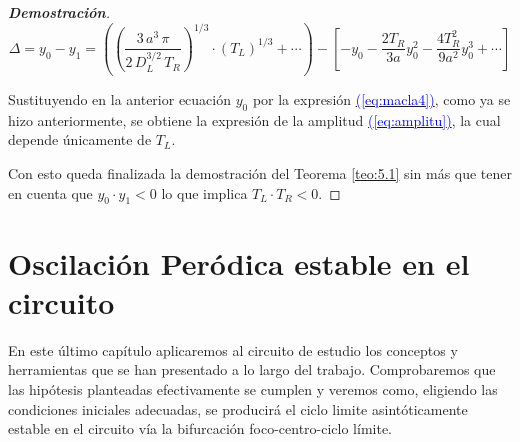 \documentclass[12pt,a4paper]{report} %
\newcommand{\eref}[1]{\hyperref[#1]{\textcolor{blue}{(\ref*{#1})}}}
\newcommand{\eref}[1]{\hyperref[#1]{\textcolor{blue}{\textit{(\ref*{#1})}}}}
\begin{document}
\begin{proof}[\textbf{Demostración}]
	\begin{equation}
		\varDelta=y_0-y_1=\left( \left( \frac{3\, a^3 \, \pi}{2\, D_L^{3/2}\, T_R} \right)^{1/3}\cdot \left(T_L\right)^{1/3}+\cdots \right) - \left[ -y_0-\frac{2T_R}{3a}y_0^2-\frac{4T_R^2}{9a^2}y_0^3+\cdots \right]
	\end{equation}\smallskip
	
	\noindent Sustituyendo en la anterior ecuación $y_0$ por la expresión \eref{eq:macla4}, como ya se hizo anteriormente, se obtiene la expresión de la amplitud \eref{eq:amplitu}, la cual depende únicamente de $T_L$.
	

\vspace{0.5cm} Con esto queda finalizada la demostración del Teorema \ref{teo:5.1} sin más que tener en cuenta que $y_0\cdot y_1<0$ lo que implica $T_L\cdot T_R<0$.

\end{proof}
	
	\newpage
	
	\chapter{Oscilación Peródica estable en el circuito}
	\label{cap.55}
	
	En este último capítulo aplicaremos al circuito de estudio los conceptos y herramientas que se han presentado a lo largo del trabajo. Comprobaremos que las hipótesis planteadas efectivamente se cumplen y veremos como, eligiendo las condiciones iniciales adecuadas, se producirá el ciclo limite asintóticamente estable en el circuito vía la bifurcación foco-centro-ciclo límite.
	
\end{document}
